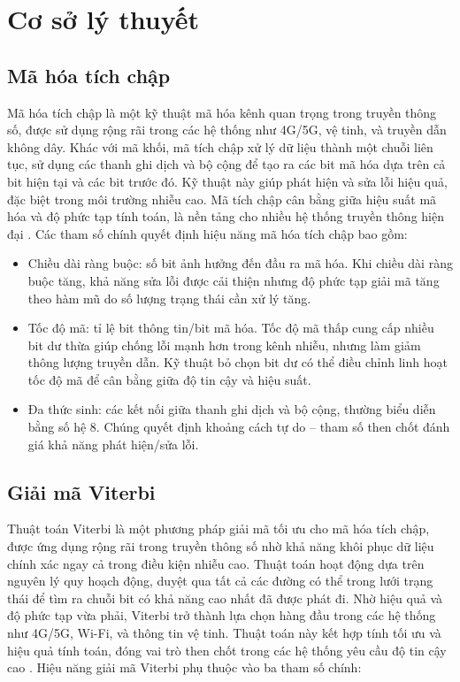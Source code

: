 \documentclass[../DoAn.tex]{subfiles}
\begin{document}
\section{Cơ sở lý thuyết}

\subsection{Mã hóa tích chập}

Mã hóa tích chập là một kỹ thuật mã hóa kênh quan trọng trong truyền thông số, được sử dụng rộng rãi trong các hệ thống như 4G/5G, vệ tinh, và truyền dẫn không dây. Khác với mã khối, mã tích chập xử lý dữ liệu thành một chuỗi liên tục, sử dụng các thanh ghi dịch và bộ cộng để tạo ra các bit mã hóa dựa trên cả bit hiện tại và các bit trước đó. Kỹ thuật này giúp phát hiện và sửa lỗi hiệu quả, đặc biệt trong môi trường nhiễu cao. Mã tích chập cân bằng giữa hiệu suất mã hóa và độ phức tạp tính toán, là nền tảng cho nhiều hệ thống truyền thông hiện đại \cite{noauthor_fundamentals_2015}. Các tham số chính quyết định hiệu năng mã hóa tích chập bao gồm:

\begin{itemize}

\item Chiều dài ràng buộc: số bit ảnh hưởng đến đầu ra mã hóa. Khi chiều dài ràng buộc tăng, khả năng sửa lỗi được cải thiện nhưng độ phức tạp giải mã tăng theo hàm mũ do số lượng trạng thái cần xử lý tăng.
\item Tốc độ mã: tỉ lệ bit thông tin/bit mã hóa. Tốc độ mã thấp cung cấp nhiều bit dư thừa giúp chống lỗi mạnh hơn trong kênh nhiễu, nhưng làm giảm thông lượng truyền dẫn. Kỹ thuật bỏ chọn bit dư có thể điều chỉnh linh hoạt tốc độ mã để cân bằng giữa độ tin cậy và hiệu suất.
\item Đa thức sinh: các kết nối giữa thanh ghi dịch và bộ cộng, thường biểu diễn bằng số hệ 8. Chúng quyết định khoảng cách tự do – tham số then chốt đánh giá khả năng phát hiện/sửa lỗi.

\end{itemize}

\subsection{Giải mã Viterbi} 

Thuật toán Viterbi là một phương pháp giải mã tối ưu cho mã hóa tích chập, được ứng dụng rộng rãi trong truyền thông số nhờ khả năng khôi phục dữ liệu chính xác ngay cả trong điều kiện nhiễu cao. Thuật toán hoạt động dựa trên nguyên lý quy hoạch động, duyệt qua tất cả các đường có thể trong lưới trạng thái để tìm ra chuỗi bit có khả năng cao nhất đã được phát đi. Nhờ hiệu quả và độ phức tạp vừa phải, Viterbi trở thành lựa chọn hàng đầu trong các hệ thống như 4G/5G, Wi-Fi, và thông tin vệ tinh. Thuật toán này kết hợp tính tối ưu và hiệu quả tính toán, đóng vai trò then chốt trong các hệ thống yêu cầu độ tin cậy cao \cite{a_viterbi_error_nodate}. Hiệu năng giải mã Viterbi phụ thuộc vào ba tham số chính:
\end{document}

